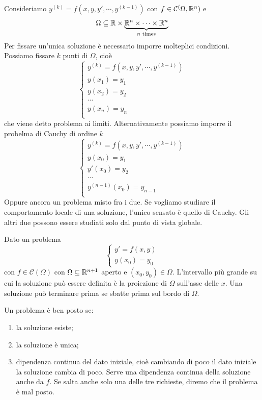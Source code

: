\documentclass[a4paper]{article}
\begin{document}
Consideriamo \(y^{(k)} = f(x,y,y', \cdots, y^{(k-1)})\)
con \(f \in \mathcal C^(\Omega, \mathbb{R}^n)\)
e \[
    \Omega \subseteq \mathbb{R} \times
    \underbrace{\mathbb{R}^n \times \cdots \times \mathbb{R}^n}_{n \text{ times}}
\]
Per fissare un'unica soluzione è necessario imporre molteplici condizioni.
Possiamo fissare \(k\) punti di \(\Omega\), cioè
\[
    \begin{cases}
        y^{(k)} = f(x,y,y', \cdots, y^{(k-1)}) \\
        y(x_1) = y_1 \\
        y(x_2) = y_2 \\
        \cdots \\
        y(x_n) = y_n \\
    \end{cases}
\]
che viene detto problema ai limiti.
Alternativamente possiamo imporre il probelma di Cauchy di ordine \(k\)
\[
    \begin{cases}
        y^{(k)} = f(x,y,y', \cdots, y^{(k-1)}) \\
        y(x_0) = y_1 \\
        y'(x_0) = y_2 \\
        \cdots \\
        y^{(n-1)}(x_0) = y_{n-1} \\
    \end{cases}
\]
Oppure ancora un problema misto fra i due.
Se vogliamo studiare il comportamento locale di una soluzione,
l'unico sensato è quello di Cauchy.
Gli altri due possono essere studiati solo dal punto di vista globale.

Dato un problema
\[
    \begin{cases}
        y' = f(x,y) \\
        y(x_0) = y_0
    \end{cases}
\]
con \(f \in \mathcal C(\Omega)\) con \(\Omega \subseteq \mathbb{R}^{n+1}\) aperto e
\((x_0, y_0) \in \Omega\).
L'intervallo più grande su cui la soluzione può essere definita è la proiezione di
\(\Omega\) sull'asse delle \(x\). Una soluzione può terminare prima se sbatte
prima sul bordo di \(\Omega\).

Un problema è ben posto se:
\begin{enumerate}
    \item la soluzione esiste;
    \item la soluzione è unica;
    \item dipendenza continua del dato iniziale, cioè cambiando di poco
    il dato iniziale la soluzione cambia di poco.
    Serve una dipendenza continua della soluzione anche da \(f\).
    Se salta anche solo una delle tre richieste, diremo che il problema è mal posto.
\end{enumerate}
\end{document}

